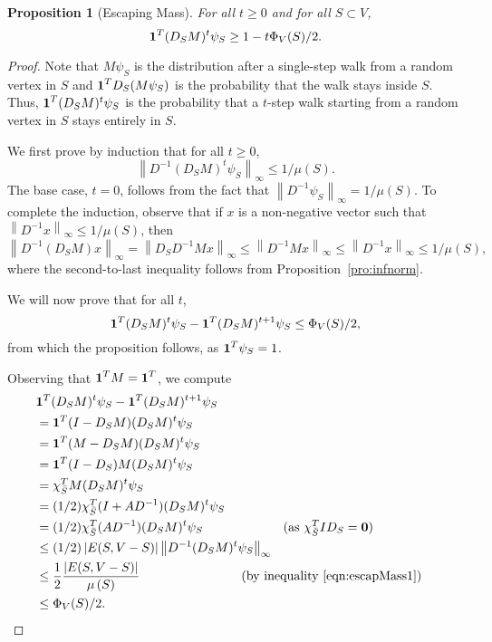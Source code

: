 \documentclass[11pt]{article}
\newtheorem{proposition}[theorem]{Proposition}
\def\form#1#2{#1^{T} #2}
\def\infnorm#1{\left\| #1 \right\|_{\infty }}
\def\sizeof#1{\left|#1  \right|}
\def\bvec#1{{\mbox{\boldmath $#1$}}}
\def\vol#1{\mu \left(#1  \right)}
\begin{document}
\begin{proposition}[Escaping Mass]\label{pro:isopLeaving}
For all $t \geq 0$ and for all $S\subset V$,
\[
\form{\bvec{1}}{(D_{S} M)^{t} \psi _{S}}
\geq
1 - t \Phi_{V} (S)/2.
\]
\end{proposition}
\begin{proof}
Note that $M \psi _{S}$ is the distribution after
  a single-step walk from a random vertex in $S$
  and $\bvec{1}^{T}D_{S} (M\psi _{S})$
  is the probability that the walk stays inside $S$.
Thus, $\form{\bvec{1}}{(D_{S} M)^{t} \psi _{S}}$
  is the probability that a $t$-step walk starting
  from a random vertex in $S$ stays entirely in $S$.

We first prove by induction that for all $t \geq 0$,
\begin{equation}\label{eqn:escapMass1}
\infnorm{D^{-1} (D_{S} M)^{t} \psi _{S}} \leq 1/\vol{S}.
\end{equation}
The base case, $t= 0$, follows from the fact that
  $\infnorm{D^{-1} \psi _{S}} = 1/\vol{S}$.
To complete the induction, observe that if
  $x$ is a non-negative vector such that
  $\infnorm{D^{-1} x} \leq 1/\vol{S}$, then
\[
\infnorm{D^{-1} (D_{S} M) x}
=
\infnorm{D_{S} D^{-1}  M x}
\leq
\infnorm{D^{-1}  M x}
\leq
\infnorm{D^{-1}  x}
\leq
1/\vol{S},
\]
where the second-to-last inequality follows from
  Proposition~\ref{pro:infnorm}.

We will now prove that for all $t$,
\[
\form{\bvec{1}}{(D_{S} M)^{t} \psi _{S}}
-
\form{\bvec{1}}{(D_{S} M)^{t+1} \psi _{S}}
\leq  \Phi_{V} (S)/2,
\]
from which the proposition follows, as $\bvec{1}^{T} \psi_{S} = 1$.

Observing that $\bvec{1}^{T} M = \bvec{1}^{T}$,
  we compute
\begin{align*}
\lefteqn{\form{\bvec{1}}{(D_{S} M)^{t} \psi _{S}}
-
\form{\bvec{1}}{(D_{S} M)^{t+1} \psi _{S}}}\\
& =
\bvec{1}^{T} (I - D_{S} M) (D_{S} M)^{t} \psi _{S}\\
& =
\bvec{1}^{T} (M - D_{S} M) (D_{S} M)^{t} \psi _{S}\\
& =
\bvec{1}^{T} (I - D_{S} ) M (D_{S} M)^{t} \psi _{S}\\
& =
\chi_{\bar{S}}^{T} M (D_{S} M)^{t} \psi _{S}\\
& =
(1/2) \chi_{\bar{S}}^{T} (I + A D^{-1}) (D_{S} M)^{t} \psi _{S}\\
& =
(1/2) \chi_{\bar{S}}^{T} (A D^{-1}) (D_{S} M)^{t} \psi _{S}
\quad \quad \quad \quad \quad \quad \text{ (as $\chi_{\bar{S}}^{T} I D_{S} = \bvec{0}$)}\\
& \leq
(1/2) \sizeof{E (S,V-S)} \infnorm{D^{-1} (D_{S} M)^{t} \psi _{S}}\\
& \leq
\frac{1}{2}\frac{\sizeof{E (S,V-S)}}{\vol{S}}
\quad \quad \quad  \quad \quad \quad  \quad \quad \text{(by inequality~\eqref{eqn:escapMass1})}\\
& \leq
 \Phi_{V} (S)/2.
\end{align*}
\end{proof}
\end{document}
